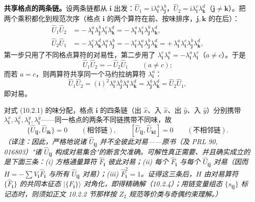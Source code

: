 \textbf{共享格点的两条链。}设两条链都从 $\pmb{i}$ 出发：$\hat U_1=\mathrm{i}\lambda_{\pmb{i}}^{a}\lambda_{\pmb{j}}^{b}$，$\hat U_2=\mathrm{i}\lambda_{\pmb{i}}^{c}\lambda_{\pmb{k}}^{d}$（$\pmb{j}\neq\pmb{k}$）。把两个乘积都化到规范次序（格点 $\pmb i$ 的两个算符在前、按味排序，$\pmb j,\pmb k$ 的在后）：
\begin{align*}
\hat U_1\hat U_2&=-\,\lambda_{\pmb{i}}^{a}\lambda_{\pmb{j}}^{b}\lambda_{\pmb{i}}^{c}\lambda_{\pmb{k}}^{d}
=-\,\lambda_{\pmb{i}}^{a}\lambda_{\pmb{i}}^{c}\lambda_{\pmb{j}}^{b}\lambda_{\pmb{k}}^{d},\\
\hat U_2\hat U_1&=-\,\lambda_{\pmb{i}}^{c}\lambda_{\pmb{k}}^{d}\lambda_{\pmb{i}}^{a}\lambda_{\pmb{j}}^{b}
=-\,\lambda_{\pmb{i}}^{c}\lambda_{\pmb{i}}^{a}\lambda_{\pmb{j}}^{b}\lambda_{\pmb{k}}^{d}
=+\,\lambda_{\pmb{i}}^{a}\lambda_{\pmb{i}}^{c}\lambda_{\pmb{j}}^{b}\lambda_{\pmb{k}}^{d},
\end{align*}
第一步只用了不同格点算符的对易性，第二步用了 $\lambda_{\pmb{i}}^{c}\lambda_{\pmb{i}}^{a}=-\lambda_{\pmb{i}}^{a}\lambda_{\pmb{i}}^{c}$（$a\neq c$）。于是
\begin{equation*}
\hat U_1\hat U_2=-\,\hat U_2\hat U_1\qquad(a\neq c);
\end{equation*}
而若 $a=c$，则两算符共享同一个马约拉纳算符 $\lambda_{\pmb{i}}^{a}$：
\begin{equation*}
\hat U_1\hat U_2=(\mathrm{i})^2\lambda_{\pmb{i}}^{a}\lambda_{\pmb{j}}^{b}\lambda_{\pmb{i}}^{a}\lambda_{\pmb{k}}^{d}
=\lambda_{\pmb{j}}^{b}\lambda_{\pmb{k}}^{d}=\hat U_2\hat U_1 ,
\end{equation*}
即对易。

对式 (10.2.1) 的味分配，格点 $\pmb{i}$ 的四条链（出 $\hat x$、入 $\hat x$、出 $\hat y$、入 $\hat y$）分别携带 $\lambda_{\pmb i}^{x},\lambda_{\pmb i}^{\bar x},\lambda_{\pmb i}^{y},\lambda_{\pmb i}^{\bar y}$——同一格点的两条不同链携带不同味，故
\begin{equation*}
\{\hat U_{\pmb{ij}},\hat U_{\pmb{ik}}\}=0\qquad(\text{相邻链}),\qquad
[\hat U_{\pmb{ij}},\hat U_{\pmb{kl}}]=0\qquad(\text{不相邻链}).
\end{equation*}
\emph{（译注：因此，严格地说诸 $\hat U_{\pmb{ij}}$ 并不全彼此对易——原书（及 PRL 90, 016803）"诸 $\hat U_{\pmb{ij}}$ 构成对易集合"的断言欠准确。可解性真正需要、并且确实成立的是下面三条：(i) 方格通量算符 $\hat F_{\pmb i}$ 彼此对易；(ii) 每个 $\hat F_{\pmb i}$ 与每个 $\hat U_{\pmb{ij}}$ 对易（因而 $H=-\sum V_{\pmb i}\hat F_{\pmb i}$ 与所有 $\hat U_{\pmb{ij}}$ 对易）；(iii) $\hat F_{\pmb i}^2=1$。证得这三条后，$H$ 由对易算符 $\{\hat F_{\pmb i}\}$ 的共同本征态 $|\{F_{\pmb i}\}\rangle$ 对角化，即得精确解（10.2.4）；用链变量组态 $\{s_{\pmb{ij}}\}$ 标记态时，则须如正文 10.2.2 节那样按 $Z_2$ 规范等价类与奇偶约束理解。）}

